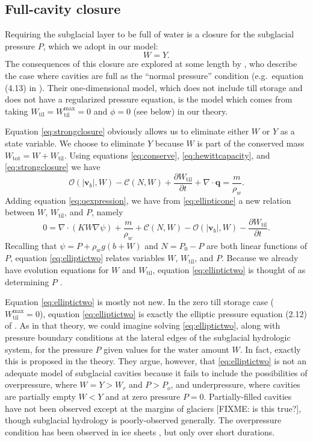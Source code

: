 \documentclass[11pt,final]{amsart}
\newcommand\bv{\mathbf{v}}
\newcommand\bq{\mathbf{q}}
\newcommand{\ddt}[1]{\ensuremath{\frac{\partial #1}{\partial t}}}
\newcommand{\Div}{\nabla\cdot}
\newcommand{\grad}{\nabla}
\newcommand{\Wtil}{W_{\text{til}}}
\newcommand{\Wtilmax}{W_{\text{til}}^{\text{max}}}
\newcommand{\Wtot}{W_{\text{tot}}}
\begin{document}
\subsection*{Full-cavity closure}  Requiring the subglacial layer to be full of water is a closure for the subglacial pressure $P$, which we adopt in our model:
\begin{equation}
W = Y.\label{eq:strongclosure}
\end{equation}
The consequences of this closure are explored at some length by \cite{Schoofetal2012}, who describe the case where cavities are full as the ``normal pressure'' condition (e.g.~equation (4.13) in \cite{Schoofetal2012}).  Their one-dimensional model, which does not include till storage and does not have a regularized pressure equation, is the model which comes from taking $\Wtil=\Wtilmax=0$ and $\phi=0$ (see below) in our theory.

Equation \eqref{eq:strongclosure} obviously allows us to eliminate either $W$ or $Y$ as a state variable.  We choose to eliminate $Y$ because $W$ is part of the conserved mass $\Wtot = W + \Wtil$.  Using equations \eqref{eq:conserve}, \eqref{eq:hewittcapacity}, and \eqref{eq:strongclosure} we have
\begin{equation}
\mathcal{O}(|\bv_b|,W) - \mathcal{C}(N,W) + \ddt{\Wtil} + \Div\bq = \frac{m}{\rho_w}. \label{eq:ellipticone}
\end{equation}
Adding equation \eqref{eq:qexpression}, we have from \eqref{eq:ellipticone} a new relation between $W$, $\Wtil$, and $P$, namely
\begin{equation}
0 = \Div\left(K W \grad \psi\right) + \frac{m}{\rho_w} + \mathcal{C}(N,W) - \mathcal{O}(|\bv_b|,W) - \ddt{\Wtil}. \label{eq:elliptictwo}
\end{equation}
Recalling that $\psi = P + \rho_w g (b+W)$ and $N=P_0-P$ are both linear functions of $P$, equation \eqref{eq:elliptictwo} relates variables $W$, $\Wtil$, and $P$.  Because we already have evolution equations for $W$ and $\Wtil$, equation \eqref{eq:elliptictwo} is thought of as determining $P$ \citep{Schoofetal2012}.

Equation \eqref{eq:elliptictwo} is mostly not new.  In the zero till storage case ($\Wtilmax=0$), equation \eqref{eq:elliptictwo} is exactly the elliptic pressure equation (2.12) of \cite{Schoofetal2012}.  As in that theory, we could imagine solving \eqref{eq:elliptictwo}, along with pressure boundary conditions at the lateral edges of the subglacial hydrologic system, for the pressure $P$ given values for the water amount $W$.  In fact, exactly this is proposed in the \cite{Schoofetal2012} theory.  They argue, however, that \eqref{eq:elliptictwo} is not an adequate model of subglacial cavities because it fails to include the possibilities of overpressure, where $W=Y>W_r$ and $P>P_o$, and underpressure, where cavities are partially empty $W<Y$ and at zero pressure $P=0$.  Partially-filled cavities have not been observed except at the margins of glaciers [FIXME: is this true?], though subglacial hydrology is poorly-observed generally.  The overpressure condition has been observed in ice sheets \citep[for example]{Dasetal08}, but only over short durations.
\end{document}
